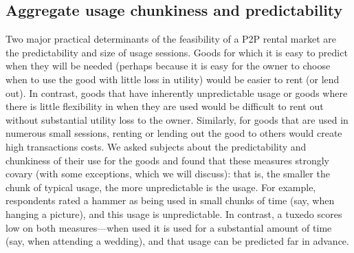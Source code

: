 \documentclass[12pt]{article}
\begin{document}
\subsection{Aggregate usage chunkiness and predictability} 
Two major practical determinants of the feasibility of a P2P rental market are the predictability and size of usage sessions.
Goods for which it is easy to predict when they will be needed (perhaps because it is easy for the owner to choose when to use the good with little loss in utility) would be easier to rent (or lend out).
In contrast, goods that have inherently unpredictable usage or goods where there is little flexibility in when they are used would be difficult to rent out without substantial utility loss to the owner.
Similarly, for goods that are used in numerous small sessions, renting or lending out the good to others would create high transactions costs.
We asked subjects about the predictability and chunkiness of their use for the goods and found that these measures strongly covary (with some exceptions, which we will discuss):
that is, the smaller the chunk of typical usage, the more unpredictable is the usage.
For example, respondents rated a hammer as being used in small chunks of time (say, when hanging a picture), and this usage is unpredictable. 
In contrast, a tuxedo scores low on both measures---when used it is used for a substantial amount of time (say, when attending a wedding), and that usage can be predicted far in advance.  
\end{document}
